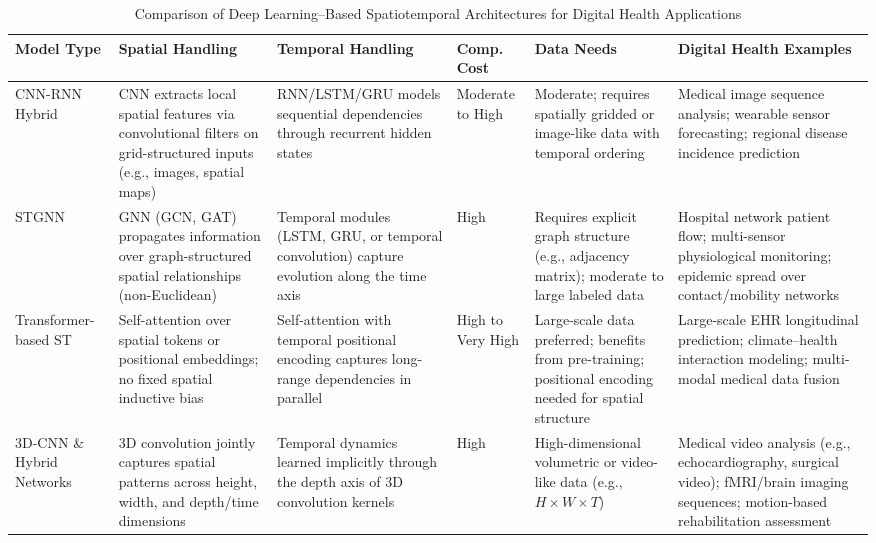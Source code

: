 \documentclass[journal]{IEEEtran}
\begin{document}
\begin{table}[htbp]
\centering
\caption{Comparison of Deep Learning--Based Spatiotemporal Architectures for Digital Health Applications}
\label{tab:st-model-comparison}
\footnotesize
\renewcommand{\arraystretch}{1.0}
\begin{tabularx}{\textwidth}{>{\raggedright\arraybackslash}p{2.2cm} >{\raggedright\arraybackslash}p{2.5cm} >{\raggedright\arraybackslash}p{2.5cm} >{\raggedright\arraybackslash}p{1.4cm} >{\raggedright\arraybackslash}p{1.8cm} >{\raggedright\arraybackslash}X}
\toprule
\textbf{Model Type} & \textbf{Spatial Handling} & \textbf{Temporal Handling} & \textbf{Comp. Cost} & \textbf{Data Needs} & \textbf{Digital Health Examples} \\
\midrule
 
CNN-RNN Hybrid
& CNN extracts local spatial features via convolutional filters on grid-structured inputs (e.g., images, spatial maps)
& RNN/LSTM/GRU models sequential dependencies through recurrent hidden states
& Moderate to High
& Moderate; requires spatially gridded or image-like data with temporal ordering
& Medical image sequence analysis; wearable sensor forecasting; regional disease incidence prediction \\
 
\addlinespace[4pt]
 
STGNN
& GNN (GCN, GAT) propagates information over graph-structured spatial relationships (non-Euclidean)
& Temporal modules (LSTM, GRU, or temporal convolution) capture evolution along the time axis
& High
& Requires explicit graph structure (e.g., adjacency matrix); moderate to large labeled data
& Hospital network patient flow; multi-sensor physiological monitoring; epidemic spread over contact/mobility networks \\
 
\addlinespace[4pt]
 
Transformer-based ST
& Self-attention over spatial tokens or positional embeddings; no fixed spatial inductive bias
& Self-attention with temporal positional encoding captures long-range dependencies in parallel
& High to Very High
& Large-scale data preferred; benefits from pre-training; positional encoding needed for spatial structure
& Large-scale EHR longitudinal prediction; climate--health interaction modeling; multi-modal medical data fusion \\

\addlinespace[4pt]

3D-CNN \& Hybrid Networks
& 3D convolution jointly captures spatial patterns across height, width, and depth/time dimensions
& Temporal dynamics learned implicitly through the depth axis of 3D convolution kernels
& High
& High-dimensional volumetric or video-like data (e.g., $H \times W \times T$)
& Medical video analysis (e.g., echocardiography, surgical video); fMRI/brain imaging sequences; motion-based rehabilitation assessment \\


\end{tabularx}
\end{table}
\end{document}
